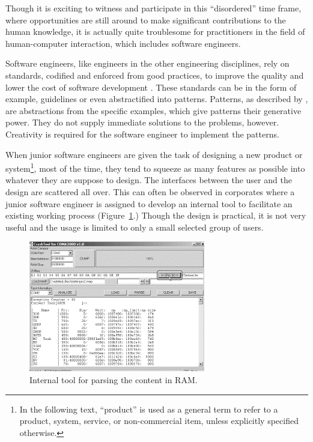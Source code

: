 \documentclass{acm_proc_article-sp}
\begin{document}
Though it is exciting to witness and participate in this
``disordered'' time frame, where opportunities are still around to
make significant contributions to the human knowledge, it is actually
quite troublesome for practitioners in the field of human-computer
interaction, which includes software engineers.

Software engineers, like engineers in the other engineering
disciplines, rely on standards, codified and enforced from good
practices, to improve the quality and lower the cost of software
development \citep{practice:ipenz}. These standards can be in the form
of example, guidelines or even abstractified into patterns. Patterns,
as described by \citet{patterns:griffiths}, are abstractions from the
specific examples, which give patterns their generative power. They do
not supply immediate solutions to the problems, however. Creativity is
required for the software engineer to implement the patterns.












When junior software engineers are given the task of designing a new
product or system\footnote{In the following text, ``product'' is used
  as a general term to refer to a product, system, service, or
  non-commercial item, unless explicitly specified otherwise.}, most
of the time, they tend to squeeze as many features as possible into
whatever they are suppose to design. The interfaces between the user
and the design are scattered all over. This can often be observed in
corporates where a junior software engineer is assigned to develop an
internal tool to facilitate an existing working process
(Figure~\ref{fig:featureful}.)  Though the design is practical, it is
not very useful and the usage is limited to only a small selected
group of users.

\begin{figure}[!t]
\centering
\includegraphics[width=.7\columnwidth]{featureful}
\caption{Internal tool for parsing the content in RAM.}
\label{fig:featureful}
\end{figure}
\end{document}
